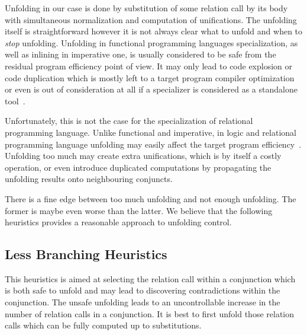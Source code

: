Unfolding in our case is done by substitution of some relation call by its body with simultaneous normalization and computation of unifications.
The unfolding itself is straightforward however it is not always clear what to unfold and when to \emph{stop} unfolding.
Unfolding in functional programming languages specialization, as well as inlining in imperative one, is usually considered to be safe from the residual program efficiency point of view.
It may only lead to code explosion or code duplication which is mostly left to a target program compiler optimization or even is out of consideration at all if a specializer is considered as a standalone tool~\cite{jonesbook}.

Unfortunately, this is not the case for the specialization of relational programming language.
Unlike functional and imperative, in logic and relational programming language unfolding may easily affect the target program efficiency~\cite{leuschel2002logic}.
Unfolding too much may create extra unifications, which is by itself a costly operation, or even introduce duplicated computations by propagating the unfolding results onto neighbouring conjuncts.

There is a fine edge between too much unfolding and not enough unfolding.
The former is maybe even worse than the latter.
We believe that the following heuristics provides a reasonable approach to unfolding control.

\subsection{Less Branching Heuristics}
\label{sec:heurictic}

This heuristics is aimed at selecting the relation call within a conjunction which is both safe to unfold and may lead to discovering contradictions within the conjunction.
The unsafe unfolding leads to an uncontrollable increase in the number of relation calls in a conjunction.
It is best to first unfold those relation calls which can be fully computed up to substitutions.

